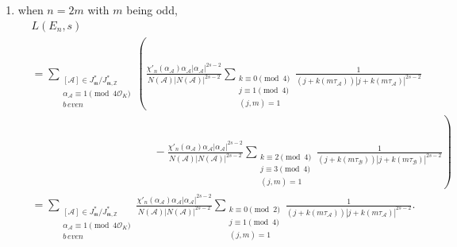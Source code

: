\documentclass[11pt, reqno]{amsart}
\theoremstyle{plain}
\theoremstyle{definition}
\numberwithin{equation}{section}
\begin{document}
\begin{enumerate}
\item when $n=2m$ with $m$ being odd,
\begin{align}
    &L(E_{n},s)\nonumber\\
     &=\sum_{\substack{[\mathcal{A}]\in J_{\mathfrak{m}}^{*}/J_{\mathfrak{m},\mathbb{Z}}^{*}\\\alpha_{\mathcal{A}}\equiv1\pmod{4\mathcal{O}_{K}}\\b\, even}}\left(\frac{\chi'_{n}(\alpha_{\mathcal{A}})\alpha_{\mathcal{A}}|\alpha_{\mathcal{A}}|^{2s-2}}{N(\mathcal{A})|N(\mathcal{A})|^{2s-2}}\nonumber\sum_{\substack{k\equiv0\pmod{4}\\j\equiv1\pmod{4}\\(j,m)=1}}\frac{1}{(j+k(m\tau_{\mathcal{A}}))|j+k(m\tau_{\mathcal{A}})|^{2s-2}}\right.\nonumber\\
    &\quad\quad\quad\quad\quad\quad\quad\quad\quad\quad\quad-\left.\frac{\chi'_{n}(\alpha_{\mathcal{A}})\alpha_{\mathcal{A}}|\alpha_{\mathcal{A}}|^{2s-2}}{N(\mathcal{A})|N(\mathcal{A})|^{2s-2}}\nonumber\sum_{\substack{k\equiv2\pmod{4}\\j\equiv3\pmod{4}\\(j,m)=1}}\frac{1}{(j+k(m\tau_{\mathcal{B}}))|j+k(m\tau_{\mathcal{B}})|^{2s-2}}\right)\\
    &=\sum_{\substack{[\mathcal{A}]\in J_{\mathfrak{m}}^{*}/J_{\mathfrak{m},\mathbb{Z}}^{*}\\\alpha_{\mathcal{A}}\equiv1\pmod{4\mathcal{O}_{K}}\\b\, even}} \frac{\chi'_{n}(\alpha_{\mathcal{A}})\alpha_{\mathcal{A}}|\alpha_{\mathcal{A}}|^{2s-2}}{N(\mathcal{A})|N(\mathcal{A})|^{2s-2}}\nonumber\sum_{\substack{k\equiv0\pmod{2}\\j\equiv1\pmod{4}\\(j,m)=1}}\frac{1}{(j+k(m\tau_{\mathcal{A}}))|j+k(m\tau_{\mathcal{A}})|^{2s-2}}.
\end{align}
\end{enumerate}
\end{document}
